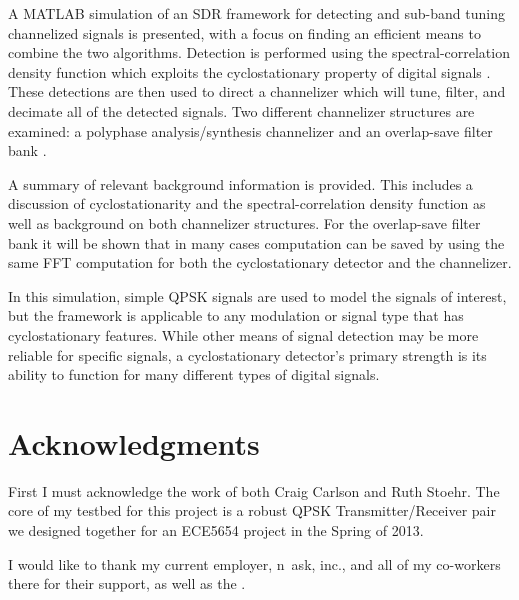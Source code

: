 \documentclass[12pt]{report}
\begin{document}
A MATLAB simulation of an SDR framework for detecting and sub-band tuning
channelized signals is presented, with a focus on finding an efficient means to
combine the two algorithms. Detection is performed using the
spectral-correlation density function which exploits the cyclostationary
property of digital signals \cite{Gardner1}.  These detections are then used to
direct a channelizer which will tune, filter, and decimate all of the detected
signals. Two different channelizer structures are examined: a polyphase
analysis/synthesis channelizer \cite{Harris1} and an overlap-save filter bank
\cite{Borgerding1}.

A summary of relevant background information is provided.  This includes
a discussion of cyclostationarity and the spectral-correlation density function
as well as background on both channelizer structures. For the overlap-save
filter bank it will be shown that in many cases computation can be saved by
using the same FFT computation for both the cyclostationary detector and the
channelizer.

In this simulation, simple QPSK signals are used to model the signals of
interest, but the framework is applicable to any modulation or signal type that
has cyclostationary features. While other means of signal detection may be more
reliable for specific signals, a cyclostationary detector's primary strength is
its ability to function for many different types of digital signals.


\vfill



\pagebreak

\chapter*{Acknowledgments}
First I must acknowledge the work of both Craig Carlson and Ruth Stoehr.
The core of my testbed for this project is a robust QPSK Transmitter/Receiver
pair we designed together for an ECE5654 project in the Spring of 2013.

I would like to thank my current employer, n~ask, inc., and all of my
co-workers there for their support, as well as  the .
\end{document}
